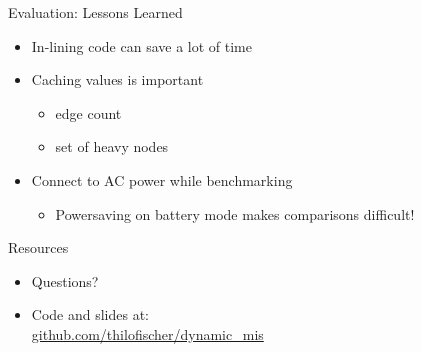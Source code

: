 \documentclass{beamer}
\begin{document}
\begin{frame}{Evaluation: Lessons Learned}
  \begin{itemize}
    \item In-lining code can save a lot of time
    \item Caching values is important
      \begin{itemize}
        \item edge count
        \item set of heavy nodes
      \end{itemize}
    \item Connect to AC power while benchmarking
      \begin{itemize}
        \item Powersaving on battery mode makes comparisons difficult!
      \end{itemize}
  \end{itemize}
\end{frame}

\begin{frame}{Resources}
  \begin{itemize}
    \item Questions?
    \item Code and slides at: \\
      \href{https://www.github.com/thilofischer/dynamic_mis}{github.com/thilofischer/dynamic\_mis}
  \end{itemize}
\end{frame}
\end{document}
